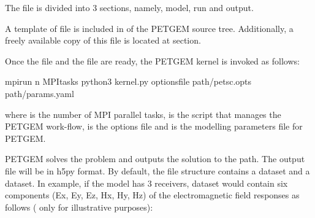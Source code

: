 \documentclass[letterpaper,10pt,english]{sphinxmanual}
\begin{document}
The  file is divided into 3 sections, namely, model,
run and output.

A template of  file is included in 
of the PETGEM source tree. Additionally, a freely available copy of this file
is located at {\hyperref[\detokenize{Download:download}]{}} section.

Once the  file and the  file are ready, the
PETGEM kernel is invoked as follows:

\begin{sphinxVerbatim}[commandchars=\\\{\}]
\PYGZdl{} mpirun \PYGZhy{}n MPI\PYGZus{}tasks python3 kernel.py \PYGZhy{}options\PYGZus{}file path/petsc.opts path/params.yaml
\end{sphinxVerbatim}

where  is the number of MPI parallel tasks,  is
the script that manages the PETGEM work-flow,  is the
 options file and 
is the modelling parameters file for PETGEM.

PETGEM solves the problem and outputs the solution to the  path.
The output file will be in h5py format. By default, the file structure contains a
 dataset and a  dataset. In example, if the
model has 3 receivers,  dataset would contain six components (Ex, Ey, Ez, Hx, Hy, Hz)
of the electromagnetic field responses as follows ( only for illustrative
purposes):
\end{document}
